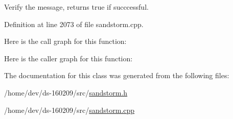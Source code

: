 Verify the message, returns true if succcessful. 



Definition at line 2073 of file sandstorm.\+cpp.



Here is the call graph for this function\+:




Here is the caller graph for this function\+:




The documentation for this class was generated from the following files\+:\begin{DoxyCompactItemize}
\item 
/home/dev/ds-\/160209/src/\hyperlink{sandstorm_8h}{sandstorm.\+h}\item 
/home/dev/ds-\/160209/src/\hyperlink{sandstorm_8cpp}{sandstorm.\+cpp}\end{DoxyCompactItemize}
